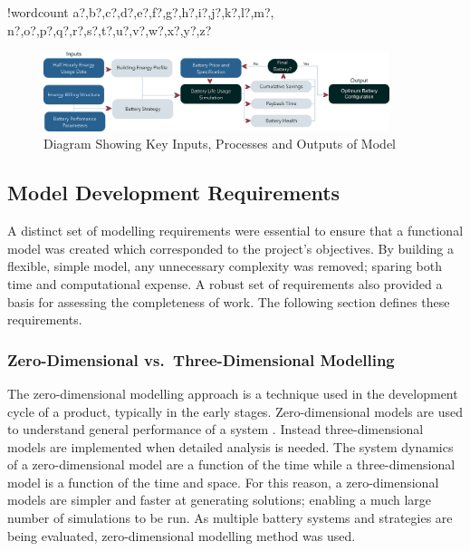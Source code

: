 \documentclass[fontsize=9.5pt]{extarticle}
\numberwithin{figure}{section} %
\newcounter{words}
\newenvironment{counted}{%
  \setcounter{words}{0}
  \SearchList!{wordcount}{\stepcounter{words}}
    {a?,b?,c?,d?,e?,f?,g?,h?,i?,j?,k?,l?,m?,
    n?,o?,p?,q?,r?,s?,t?,u?,v?,w?,x?,y?,z?}
  \UndoBoundary{'}
  \SearchOrder{p;}}{%
  \StopSearching}
\begin{document}
\begin{counted}
\begin{figure}[H]
 \centering
   \vspace{-7pt}
 \includegraphics[trim = 0 0 0 0, clip, width=0.9\textwidth]{SystemLogic1.eps}
  \vspace{-10pt}
 \caption{Diagram Showing Key Inputs, Processes and Outputs of Model}
 \label{SystemLogic1}
 \vspace{-30pt}
 \end{figure}

\subsection{Model Development
Requirements}\label{model-development-requirements}

A distinct set of modelling requirements were essential to ensure that a
functional model was created which corresponded to the project's
objectives. By building a flexible, simple model, any unnecessary
complexity was removed; sparing both time and computational expense. A
robust set of requirements also provided a basis for assessing the
completeness of work. The following section defines these requirements.

\subsubsection{Zero-Dimensional vs.~Three-Dimensional
Modelling}\label{zero-dimensional-vs.three-dimensional-modelling}

The zero-dimensional modelling approach is a technique used in the
development cycle of a product, typically in the early stages.
Zero-dimensional models are used to understand general performance of a
system \autocite{ZeroDMod80:online}. Instead three-dimensional models
are implemented when detailed analysis is needed. The system dynamics of
a zero-dimensional model are a function of the time while a
three-dimensional model is a function of the time and space. For this
reason, a zero-dimensional models are simpler and faster at generating
solutions; enabling a much large number of simulations to be run. As
multiple battery systems and strategies are being evaluated,
zero-dimensional modelling method was used.


\end{counted}
\end{document}

